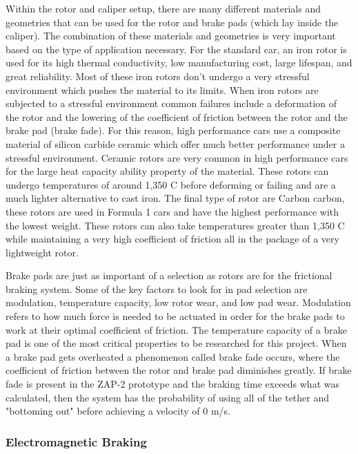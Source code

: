 \indent\indent Within the rotor and caliper setup, there are many different materials and geometries that can be used for the rotor and brake pads (which lay inside the caliper). The combination of these materials and geometries is very important based on the type of application necessary. For the standard car, an iron rotor is used for its high thermal conductivity, low manufacturing cost, large lifespan, and great reliability. Most of these iron rotors don’t undergo a very stressful environment which pushes the material to its limits. When iron rotors are subjected to a stressful environment common failures include a deformation of the rotor and the lowering of the coefficient of friction between the rotor and the brake pad (brake fade). For this reason, high performance cars use a composite material of silicon carbide ceramic which offer much better performance under a stressful environment. Ceramic rotors are very common in high performance cars for the large heat capacity ability property of the material. These rotors can undergo temperatures of around 1,350 \degree C before deforming or failing and are a much lighter alternative to cast iron. The final type of rotor are Carbon carbon, these rotors are used in Formula 1 cars and have the highest performance with the lowest weight. These rotors can also take temperatures greater than 1,350 \degree C while maintaining a very high coefficient of friction all in the package of a very lightweight rotor.

\indent\indent Brake pads are just as important of a selection as rotors are for the frictional braking system. Some of the key factors to look for in pad selection are  modulation, temperature capacity, low rotor wear, and low pad wear. Modulation refers to how much force is needed to be actuated in order for the brake pads to work at their optimal coefficient of friction. The temperature capacity of a brake pad is one of the most critical properties to be researched for this project. When a brake pad gets overheated a phenomenon called brake fade occurs, where the coefficient of friction between the rotor and brake pad diminishes greatly. If brake fade is present in the ZAP-2 prototype and the braking time exceeds what was calculated, then the system has the probability of using all of the tether and "bottoming out" before achieving a velocity of 0 m/s.

\subsubsection{Electromagnetic Braking}

